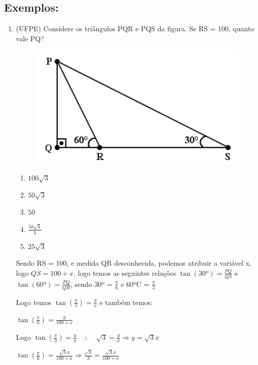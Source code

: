 \begin{multicols*}{2}
    \subsection*{Exemplos:}
    \begin{enumerate}[wide, labelwidth=!, labelindent=0pt]
        \item(UFPE) Considere os triângulos PQR e PQS da figura. Se RS = 100, quanto vale PQ?

        \begin{figure}[H]
            \centering
            \includegraphics[scale=0.38]{assets/rafael/img39.png}
        \end{figure}
        \begin{enumerate}
            \item $100 \sqrt{3}$
            \item $50 \sqrt{3} $
            \item $ 50$
            \item $\frac{50 \sqrt{3}}{3}$
            \item $25 \sqrt{3}$
        \end{enumerate}
        Sendo RS = 100, e medida QR desconhecida, podemos atribuir a variável x, logo $QS = 100 + x$, logo temos as seguintes relações $\tan(30º) = \frac{PQ}{QS}$ e $\tan(60º) = \frac{PQ}{QR}$, sendo 30º = $\frac{\pi}{6}$ e 60ºC = $\frac{\pi}{3}$

        Logo temos $\tan \left( \frac{\pi}{3} \right) = \frac{y}{x}$ e também temos:

        $\tan \left( \frac{\pi}{6} \right) = \frac{y}{100 +x}$

        Logo $\tan \left( \frac{\pi}{3} \right) = \frac{y}{x} \quad \therefore \quad\ \sqrt{3} = \frac{y}{x} \Rightarrow y = \sqrt{3}x$

        $\tan \left( \frac{\pi}{6} \right) = \frac{\sqrt{3} x}{100 +x} \Rightarrow
            \frac{\sqrt{3}}{3} = \frac{\sqrt{3} x}{100 +x}$


\end{enumerate}
\end{multicols*}
